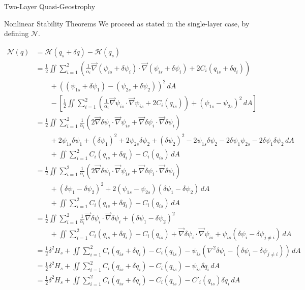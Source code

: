 \documentclass[12pt]{article}
\begin{document}
\begin{section}{Two-Layer Quasi-Geostrophy}
    \begin{subsection}{Nonlinear Stability Theorems}
        We proceed as stated in the single-layer case, by defining $\mathcal{N}$.

        \begin{align*}
            \mathcal{N}(q)
            & = \mathcal{H}(q_s + \delta q) - \mathcal{H}(q_s) \\
            &= \frac12 \iint \sum_{i=1}^2 \left( \frac{1}{\alpha_i}\vec\nabla (\psi_{is} + \delta\psi_i) \cdot \vec\nabla (\psi_{is} + \delta\psi_i) + 2C_i(q_{is} + \delta q_i) \right) \\
            &\quad\quad + ((\psi_{1s} + \delta\psi_1) - (\psi_{2s} + \delta\psi_2))^2 \, dA \\
            &\quad\quad - \left[ \frac12 \iint \sum_{i=1}^2 \left( \frac{1}{\alpha_i}\vec\nabla \psi_{is} \cdot \vec\nabla \psi_{is} + 2C_i(q_{is}) \right) + (\psi_{1s} - \psi_{2s})^2 \, dA \right] \\
            &= \frac12 \iint \sum_{i=1}^2 \frac{1}{\alpha_i} (2 \vec\nabla\delta\psi_i \cdot \vec\nabla\psi_{is} + \vec\nabla\delta\psi_i \cdot \vec\nabla\delta\psi_i) \\
            &\quad\quad + 2\psi_{1s}\delta\psi_1 + (\delta\psi_1)^2 + 2\psi_{2s}\delta\psi_2 + (\delta\psi_2)^2 - 2\psi_{1s}\delta\psi_2 - 2\delta\psi_1\psi_{2s} - 2\delta\psi_1\delta\psi_2 \, dA \\
            &\quad\quad + \iint \sum_{i=1}^2 C_i(q_{is} + \delta q_i) - C_i(q_{is}) \, dA \\
            &= \frac12 \iint \sum_{i=1}^2 \frac{1}{\alpha_i} (2 \vec\nabla\delta\psi_i \cdot \vec\nabla\psi_{is} + \vec\nabla\delta\psi_i \cdot \vec\nabla\delta\psi_i) \\
            &\quad\quad + (\delta\psi_1 - \delta\psi_2)^2 + 2(\psi_{1s} - \psi_{2s})(\delta\psi_1 - \delta\psi_2) \, dA \\
            &\quad\quad + \iint \sum_{i=1}^2 C_i(q_{is} + \delta q_i) - C_i(q_{is}) \, dA \\
            &= \frac12 \iint \sum_{i=1}^2 \frac{1}{\alpha_i} \vec\nabla\delta\psi_i \cdot \vec\nabla\delta\psi_i + (\delta\psi_1 - \delta\psi_2)^2 \\
            &\quad\quad + \iint \sum_{i=1}^2 C_i(q_{is} + \delta q_i) - C_i(q_{is}) + \vec\nabla\delta\psi_i \cdot \vec\nabla\psi_{is} + \psi_{is}(\delta\psi_i - \delta\psi_{j \ne i}) \, dA \\
            &= \frac12 \delta^2 H_s + \iint \sum_{i=1}^2 C_i(q_{is} + \delta q_i) - C_i(q_{is}) - \psi_{is}(\nabla^2\delta\psi_i - (\delta\psi_i - \delta\psi_{j \ne i})) \, dA \\
            &= \frac12 \delta^2 H_s + \iint \sum_{i=1}^2 C_i(q_{is} + \delta q_i) - C_i(q_{is}) - \psi_{is}\delta q_i \, dA \\
            &= \frac12 \delta^2 H_s + \iint \sum_{i=1}^2 C_i(q_{is} + \delta q_i) - C_i(q_{is}) - C'_i(q_{is})\delta q_i \, dA \\
        \end{align*}
    \end{subsection}
\end{section}
\end{document}
